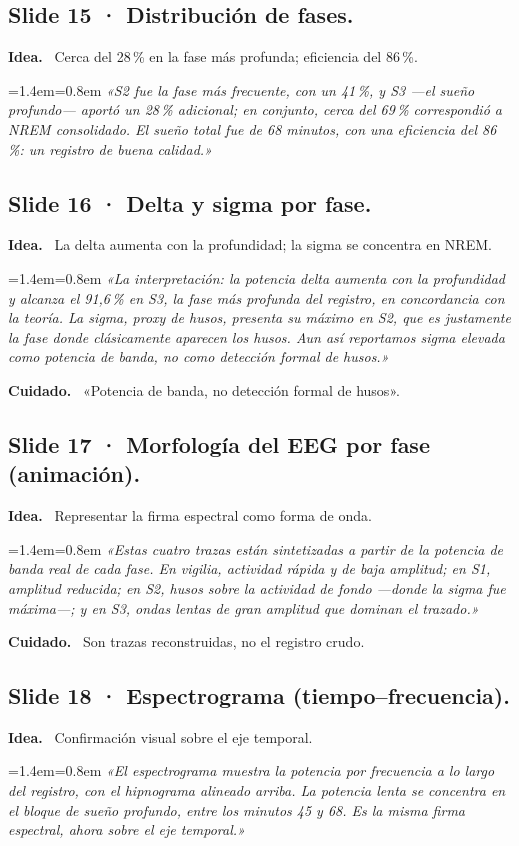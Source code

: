\documentclass[11pt,a4paper]{article}
\newenvironment{guion}%
{\par\smallskip\begingroup\leftskip=1.4em\rightskip=0.8em\color{ink}\itshape}%
{\par\endgroup\smallskip}
\newcommand{\lab}[1]{\textbf{\color{ink}#1}\ }
\begin{document}
\subsection{Slide 15 · Distribución de fases.}
\lab{Idea.} Cerca del 28\,\% en la fase más profunda; eficiencia del 86\,\%.
\begin{guion}
«S2 fue la fase más frecuente, con un 41\,\%, y S3 ---el sueño profundo--- aportó un 28\,\% adicional; en
conjunto, cerca del 69\,\% correspondió a NREM consolidado. El sueño total fue de 68 minutos, con una
eficiencia del 86\,\%: un registro de buena calidad.»
\end{guion}

\subsection{Slide 16 · Delta y sigma por fase.}
\lab{Idea.} La delta aumenta con la profundidad; la sigma se concentra en NREM.
\begin{guion}
«La interpretación: la potencia delta aumenta con la profundidad y alcanza el 91,6\,\% en S3, la fase más
profunda del registro, en concordancia con la teoría. La sigma, proxy de husos, presenta su máximo en S2,
que es justamente la fase donde clásicamente aparecen los husos. Aun así reportamos sigma elevada como
potencia de banda, no como detección formal de husos.»
\end{guion}
\lab{Cuidado.} «Potencia de banda, no detección formal de husos».

\subsection{Slide 17 · Morfología del EEG por fase (animación).}
\lab{Idea.} Representar la firma espectral como forma de onda.
\begin{guion}
«Estas cuatro trazas están sintetizadas a partir de la potencia de banda real de cada fase. En vigilia,
actividad rápida y de baja amplitud; en S1, amplitud reducida; en S2, husos sobre la actividad de fondo
---donde la sigma fue máxima---; y en S3, ondas lentas de gran amplitud que dominan el trazado.»
\end{guion}
\lab{Cuidado.} Son trazas reconstruidas, no el registro crudo.

\subsection{Slide 18 · Espectrograma (tiempo--frecuencia).}
\lab{Idea.} Confirmación visual sobre el eje temporal.
\begin{guion}
«El espectrograma muestra la potencia por frecuencia a lo largo del registro, con el hipnograma alineado
arriba. La potencia lenta se concentra en el bloque de sueño profundo, entre los minutos 45 y 68. Es la
misma firma espectral, ahora sobre el eje temporal.»
\end{guion}
\end{document}
